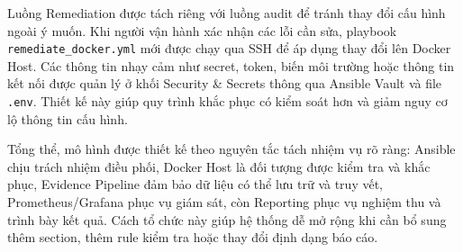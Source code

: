 Luồng Remediation được tách riêng với luồng audit để tránh thay đổi cấu hình ngoài ý muốn. Khi người vận hành xác nhận các lỗi cần sửa, playbook \texttt{remediate\_docker.yml} mới được chạy qua SSH để áp dụng thay đổi lên Docker Host. Các thông tin nhạy cảm như secret, token, biến môi trường hoặc thông tin kết nối được quản lý ở khối Security \& Secrets thông qua Ansible Vault và file \texttt{.env}. Thiết kế này giúp quy trình khắc phục có kiểm soát hơn và giảm nguy cơ lộ thông tin cấu hình.

Tổng thể, mô hình được thiết kế theo nguyên tắc tách nhiệm vụ rõ ràng: Ansible chịu trách nhiệm điều phối, Docker Host là đối tượng được kiểm tra và khắc phục, Evidence Pipeline đảm bảo dữ liệu có thể lưu trữ và truy vết, Prometheus/Grafana phục vụ giám sát, còn Reporting phục vụ nghiệm thu và trình bày kết quả. Cách tổ chức này giúp hệ thống dễ mở rộng khi cần bổ sung thêm section, thêm rule kiểm tra hoặc thay đổi định dạng báo cáo.
